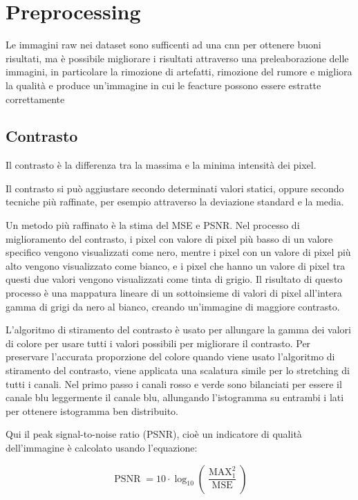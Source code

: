 \chapter{Preprocessing}\label{preprocessing}

Le immagini raw nei dataset sono sufficenti ad una \gls{cnn} per ottenere buoni risultati, ma è possibile migliorare i risultati attraverso una preleaborazione delle immagini, in particolare la rimozione di artefatti, rimozione del rumore e migliora la qualità e
produce un'immagine in cui le feacture  possono essere estratte correttamente\cite{permual_contrast}

\section{Contrasto}\label{contrasto}

Il contrasto è la differenza tra la massima e la minima
intensità dei pixel. 

Il contrasto si può aggiustare secondo determinati valori statici, oppure secondo tecniche più raffinate, per esempio attraverso la deviazione standard e la media. 

Un metodo più raffinato è la stima del MSE e PSNR. Nel processo di miglioramento del contrasto, i pixel con
valore di pixel più basso di un valore specifico vengono visualizzati come
nero, mentre i pixel con un valore di pixel più alto vengono
visualizzato come bianco, e i pixel che hanno un valore di pixel
tra questi due valori vengono visualizzati come tinta di grigio.
Il risultato di questo processo è una mappatura lineare di un
sottoinsieme di valori di pixel all'intera gamma di grigi da
nero al bianco, creando un'immagine di maggiore contrasto. 

L'algoritmo di stiramento del contrasto è usato per allungare
la gamma dei valori di colore per usare tutti i valori possibili per
migliorare il contrasto. Per preservare l'accurata proporzione del colore
quando viene usato l'algoritmo di stiramento del contrasto,
viene applicata una scalatura simile per lo stretching di tutti i canali. Nel primo
passo i canali rosso e verde sono bilanciati per essere il canale blu
leggermente il canale blu, allungando l'istogramma su entrambi i lati per ottenere
istogramma ben distribuito.

Qui il peak signal-to-noise ratio (PSNR), cioè un indicatore di qualità dell'immagine è calcolato usando l'equazione:

\[ \operatorname{PSNR}=10 \cdot \log _{10}\left(\frac{\operatorname{MAX}_{1}^{2}}{\operatorname{MSE}}\right) \]

